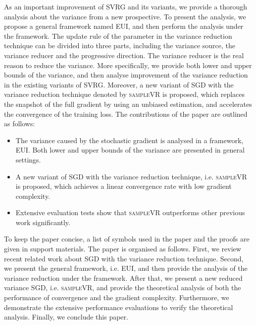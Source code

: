 \documentclass[letterpaper]{article}
\begin{document}
As an important improvement of SVRG and its variants, we provide a thorough analysis about the variance from a new prospective. To present the analysis, we propose  a general framework named EUI, and then perform the analysis under the framework. The  update rule of the parameter in the variance reduction technique can be divided into three parts, including the variance source, the variance reducer and the progressive direction. The variance reducer is the real reason to reduce the variance.  More specifically, we provide both lower and upper bounds of the variance, and then analyse improvement of the variance reduction in the existing variants of SVRG.   Moreover, a new variant of SGD with the variance reduction technique denoted by \textsc{sampleVR} is proposed, which replaces the snapshot of the full gradient by using an unbiased estimation, and accelerates the convergence of the training loss.  The contributions of the paper are outlined as follows:
\begin{itemize}
\item  The variance caused by the stochastic gradient is analysed in a framework, EUI. Both lower and upper bounds of the variance are presented in general settings.
\item A new variant of SGD with the variance reduction technique, i.e. \textsc{sampleVR} is proposed, which achieves a linear convergence rate with low gradient complexity.
\item Extensive evaluation tests show that \textsc{sampleVR} outperforms  other previous work significantly. 
\end{itemize}

To keep the paper concise, a list of symbols   used in the paper and the proofs are given in support materials. The paper is organised as follows. First, we review recent related work about SGD with the variance reduction technique. Second, we  present the general framework, i.e. EUI, and then provide the analysis of the variance reduction under the framework. After that, we present a new reduced variance SGD, i.e. \textsc{sampleVR}, and provide the theoretical analysis of both the performance of convergence and the gradient complexity.   Furthermore, we  demonstrate the extensive performance evaluations to verify the theoretical analysis. Finally, we conclude this paper. 


\end{document}
